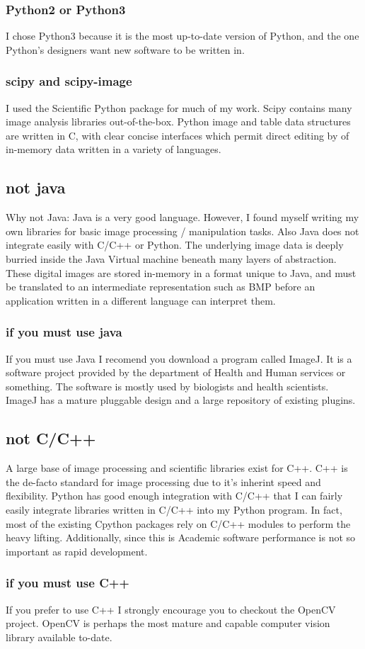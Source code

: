 \subsubsection{Python2 or Python3}
I chose Python3 because it is the most up-to-date version of Python, and the one Python's designers want new software to be written in.


\subsubsection{scipy and scipy-image}
I used the Scientific Python package for much of my work. Scipy contains many image analysis libraries out-of-the-box.  Python image and table data structures are written in C, with clear concise interfaces which permit direct editing by of in-memory data written in a variety of languages.

\subsection{not java}
Why not Java:  Java is a very good language. However, I found myself writing my own libraries for basic image processing / manipulation tasks.  Also Java does not integrate easily with C/C++ or Python.  The underlying image data is deeply burried inside the Java Virtual machine beneath many layers of abstraction. These digital images are stored in-memory in a format unique to Java, and must be translated to an intermediate representation such as BMP before an application written in a different language can interpret them.

\subsubsection{if you must use java}
If you must use Java I recomend you download a program called ImageJ. It is a software project provided by the department of Health and Human services or something.  The software is mostly used by biologists and health scientists. ImageJ has a mature pluggable design and a large repository of existing plugins.

\subsection{not C/C++}
A large base of image processing and scientific libraries exist for C++. C++ is the de-facto standard for image processing due to it's inherint speed and flexibility. Python has good enough integration with C/C++ that I can fairly easily integrate libraries written in C/C++ into my Python program.  In fact, most of the existing Cpython packages rely on C/C++ modules to perform the heavy lifting.  Additionally, since this is Academic software performance is not so important as rapid development.

\subsubsection{if you must use C++}
If you prefer to use C++ I strongly encourage you to checkout the OpenCV project. OpenCV is perhaps the most mature and capable computer vision library  available to-date.

\newpage
